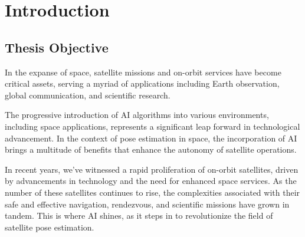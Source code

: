 \chapter{Introduction} %

\label{Chapter1} %


\section{Thesis Objective}

In the expanse of space, satellite missions and on-orbit services have become critical assets, serving a myriad of applications including Earth observation, global communication, and scientific research.

The progressive introduction of AI algorithms into various environments, including space applications, represents a significant leap forward in technological advancement. In the context of pose estimation in space, the incorporation of AI brings a multitude of benefits that enhance the  autonomy of satellite operations.

In recent years, we've witnessed a rapid proliferation of on-orbit satellites, driven by advancements in technology and the need for enhanced space services. As the number of these satellites continues to rise, the complexities associated with their safe and effective navigation, rendezvous, and scientific missions have grown in tandem. This is where AI shines, as it steps in to revolutionize the field of satellite pose estimation.


